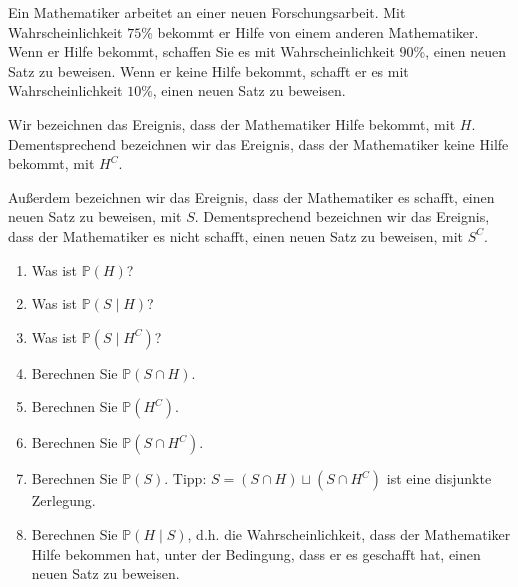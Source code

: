 \documentclass{article}
\begin{document}
\begin{problem}
Ein Mathematiker arbeitet an einer neuen Forschungsarbeit. Mit Wahrscheinlichkeit $75\%$ bekommt er Hilfe von einem anderen Mathematiker. Wenn er Hilfe bekommt, schaffen Sie es mit Wahrscheinlichkeit $90\%$, einen neuen Satz zu beweisen. Wenn er keine Hilfe bekommt, schafft er es mit Wahrscheinlichkeit $10\%$, einen neuen Satz zu beweisen.
\par
Wir bezeichnen das Ereignis, dass der Mathematiker Hilfe bekommt, mit $H$. Dementsprechend bezeichnen wir das Ereignis, dass der Mathematiker keine Hilfe bekommt, mit $H^C$.
\par
Außerdem bezeichnen wir das Ereignis, dass der Mathematiker es schafft, einen neuen Satz zu beweisen, mit $S$. Dementsprechend bezeichnen wir das Ereignis, dass der Mathematiker es nicht schafft, einen neuen Satz zu beweisen, mit $S^C$.
\begin{enumerate}
\item {
Was ist $\mathbb{P}(H)$?
}
\item {
Was ist $\mathbb{P}(S \mid H)$?
}
\item {
Was ist $\mathbb{P}(S \mid H^C)$?
}
\item {
Berechnen Sie $\mathbb{P}(S \cap H)$.
}
\item {
Berechnen Sie $\mathbb{P}(H^C)$.
}
\item {
Berechnen Sie $\mathbb{P}(S \cap H^C)$.
}
\item {
Berechnen Sie $\mathbb{P}(S)$. Tipp: $S = (S \cap H) \sqcup (S \cap H^C)$ ist eine disjunkte Zerlegung.
}
\item {
Berechnen Sie $\mathbb{P}(H \mid S)$, d.h. die Wahrscheinlichkeit, dass der Mathematiker Hilfe bekommen hat, unter der Bedingung, dass er es geschafft hat, einen neuen Satz zu beweisen.
}
\end{enumerate}
\end{problem}
\end{document}
